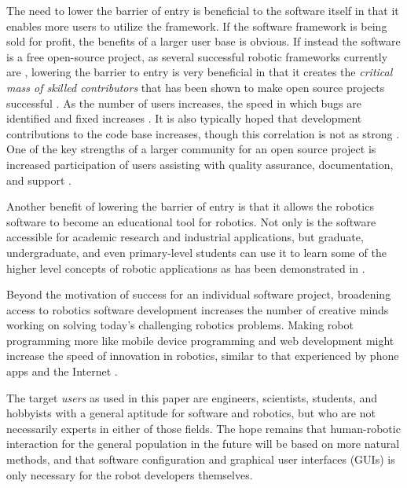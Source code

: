 \documentclass[10pt,journal,compsoc]{joser1}
\begin{document}
{The need to lower the barrier of entry is beneficial to the software itself in that it enables more users to utilize the framework. If the software framework is being sold for profit, the benefits of a larger user base is obvious. If instead the software is a free open-source project, as several successful robotic frameworks currently are \cite{makarenko2007benefits}, lowering the barrier to entry is very beneficial in that it creates the \textit{critical mass of skilled contributors} that has been shown to make open source projects successful \cite{bruyninckx2001open}. As the number of users increases, the speed in which bugs are identified and fixed increases \cite{schmidt1999software}. It is also typically hoped that development contributions to the code base increases, though this correlation is not as strong \cite{schmidt1999software}. One of the key strengths of a larger community for an open source project is increased participation of users assisting with quality assurance, documentation, and support 
\cite{schmidt2001leveraging}.

Another benefit of lowering the barrier of entry is that it allows the robotics software to become an educational tool for robotics. Not only is the software accessible for academic research and industrial applications, but graduate, undergraduate, and even primary-level students can use it to learn some of the higher level concepts of robotic applications as has been demonstrated in \cite{correll2013one, moll2011teaching, guyot2011teaching}. 

Beyond the motivation of success for an individual software project, broadening access to robotics software development increases the number of creative minds working on solving today's challenging robotics problems. Making robot programming more like mobile device programming and web development might increase the speed of innovation in robotics, similar to that experienced by phone apps and the Internet \cite{boudreau2012let}.

The target \textit{users} as used in this paper are engineers, scientists, students, and hobbyists with a general aptitude for software and robotics, but who are not necessarily experts in either of those fields. The hope remains that human-robotic interaction for the general population in the future will be based on more natural methods, and that software configuration and graphical user interfaces (GUIs) is only necessary for the robot developers themselves.

}
\end{document}
